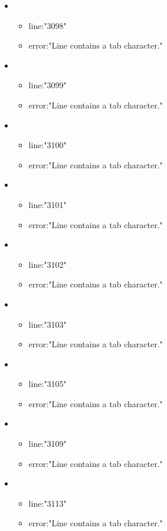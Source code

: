 \begin{itemize}
	\item 
	\begin{itemize} 
		\item line:"3098" 
		\item error:"Line contains a tab character." 
	\end{itemize}
	\item 
	\begin{itemize} 
		\item line:"3099" 
		\item error:"Line contains a tab character." 
	\end{itemize}
	\item 
	\begin{itemize} 
		\item line:"3100" 
		\item error:"Line contains a tab character." 
	\end{itemize}
	\item 
	\begin{itemize} 
		\item line:"3101" 
		\item error:"Line contains a tab character." 
	\end{itemize}
	\item 
	\begin{itemize} 
		\item line:"3102" 
		\item error:"Line contains a tab character." 
	\end{itemize}
	\item 
	\begin{itemize} 
		\item line:"3103" 
		\item error:"Line contains a tab character." 
	\end{itemize}
	\item 
	\begin{itemize} 
		\item line:"3105" 
		\item error:"Line contains a tab character." 
	\end{itemize}
	\item 
	\begin{itemize} 
		\item line:"3109" 
		\item error:"Line contains a tab character." 
	\end{itemize}
	\item 
	\begin{itemize} 
		\item line:"3113" 
		\item error:"Line contains a tab character." 
	\end{itemize}

\end{itemize}
